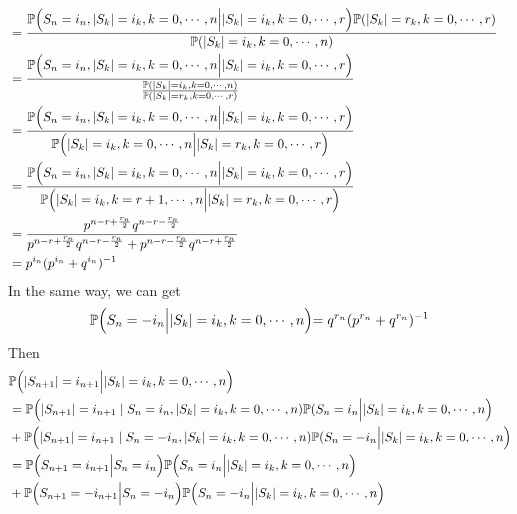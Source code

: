 \documentclass{ctexart}
\begin{document}
\begin{solution}
\begin{enumerate}
\[\begin{aligned}
          \\                                     & =          \frac{\mathbb{P}\Bigl(S_{n}=i_n,|S_k|=i_k,k=0,\cdots,n\Bigl| |S_k|=i_k,k=0,\cdots,r\Bigl)\mathbb{P}(|S_k|=r_k,k=0,\cdots,r)}{\mathbb{P}(|S_k|=i_k,k=0,\cdots,n)}
          \\                                     & =          \frac{\mathbb{P}\Bigl(S_{n}=i_n,|S_k|=i_k,k=0,\cdots,n\Bigl| |S_k|=i_k,k=0,\cdots,r\Bigl)}{\frac{\mathbb{P}(|S_k|=i_k,k=0,\cdots,n)}{\mathbb{P}(|S_k|=r_k,k=0,\cdots,r)}}
          \\                                     & =          \frac{\mathbb{P}\Bigl(S_{n}=i_n,|S_k|=i_k,k=0,\cdots,n\Bigl||S_k|=i_k,k=0,\cdots,r\Bigl)}{\mathbb{P}\Bigl(|S_k|=i_k,k=0,\cdots,n\Bigl| |S_k|=r_k,k=0,\cdots,r\Bigl)}
          \\                                     & =          \frac{\mathbb{P}\Bigl(S_{n}=i_n,|S_k|=i_k,k=0,\cdots,n\Bigl||S_k|=i_k,k=0,\cdots,r\Bigl)}{\mathbb{P}\Bigl(|S_k|=i_k,k=r + 1,\cdots,n\Bigl| |S_k|=r_k,k=0,\cdots,r\Bigl)}
          \\                                     & =\frac{p^{n - r + \frac{r_n}{2}}q^{n-r - \frac{r_n}{2}}}{p^{n - r + \frac{r_n}{2}}q^{n-r - \frac{r_n}{2}}+p^{n - r - \frac{r_n}{2}}q^{n-r + \frac{r_n}{2}}}
          \\&=p^{i_n}(p^{i_n}+q^{i_n})^{-1}
        \end{aligned}
      \]
      In the same way, we can get
      \[
        \mathbb{P}\Bigl(S_{n}=-i_n\Bigl|  |S_k|=i_k,k=0,\cdots,n\Bigl)=q^{r_n}(p^{r_n}+q^{r_n})^{-1}
      \]
      Then
      \[
        \begin{aligned}
           & \mathbb{P}\Bigl(|S_{n + 1}|=i_{n + 1}\Bigl|  |S_k|=i_k,k=0,\cdots,n\Bigl)
          \\                          & =          \mathbb{P}\Bigl(|S_{n + 1}|=i_{n + 1}\mid S_n=i_n ,|S_k|=i_k,k=0,\cdots,n)\mathbb{P}(S_n=i_n \Bigl| |S_k|=i_k,k=0,\cdots,n\Bigl)
          \\                        & +\mathbb{P}\Bigl(|S_{n + 1}|=i_{n + 1}\mid S_n=-i_n ,|S_k|=i_k,k=0,\cdots,n)\mathbb{P}(S_n=-i_n \Bigl| |S_k|=i_k,k=0,\cdots,n\Bigl)
          \\                        & =\mathbb{P}\Bigl(S_{n + 1}=i_{n + 1}\Bigl|S_n=i_n\Bigl) \mathbb{P}\Bigl(S_n=i_n \Bigl| |S_k|=i_k,k=0,\cdots,n\Bigl)
          \\                        & +\mathbb{P}\Bigl(S_{n + 1}=-i_{n + 1}\Bigl|S_n=-i_n\Bigl) \mathbb{P}\Bigl(S_n=-i_n \Bigl| |S_k|=i_k,k=0,\cdots,n\Bigl)

\end{aligned}\]
\end{enumerate}
\end{solution}
\end{document}

